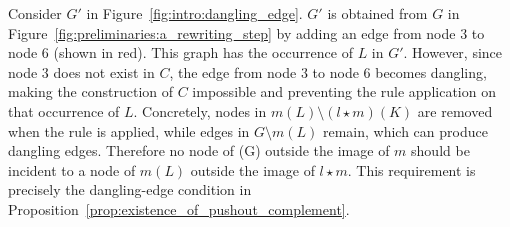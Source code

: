 Consider $G'$ in Figure~\ref{fig:intro:dangling_edge}. $G'$ is obtained from $G$ in Figure~\ref{fig:preliminaries:a_rewriting_step} by adding an edge from node $3$ to node $6$ (shown in red). This graph has the occurrence  of $L$ in $G'$. However, since node $3$ does not exist in $C$, the edge from node $3$ to node $6$ becomes dangling, making the construction of $C$ impossible and preventing the rule application on that occurrence of $L$. Concretely, nodes in \(m(L)\setminus (l\star m)(K)\) are removed when the rule is applied, while edges in \(G\setminus m(L)\) remain, which can produce dangling edges. Therefore no node of (G) outside the image of \(m\) should be incident to a node of \(m(L)\) outside the image of \(l\star m\). This requirement is precisely the dangling-edge condition in Proposition~\ref{prop:existence_of_pushout_complement}.

